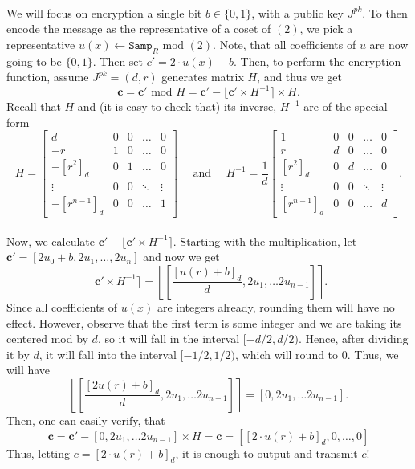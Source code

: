 \documentclass{article}
\theoremstyle{definition}
\theoremstyle{example}
\renewcommand{\mod}{\,\,\text{mod}\,\,}
\newcommand{\Samp}{\texttt{Samp}}
\renewcommand{\vec}[1]{\mathbf{#1}}
\begin{document}
\paragraph{} We will focus on encryption a single bit $b \in \{0, 1\}$, with a
public key $J^{pk}$. To then encode the message as the representative of a coset
of $(2)$, we pick a representative $u(x) \leftarrow \Samp_R \mod (2)$. Note, that all
coefficients of $u$ are now going to be $\{0, 1\}$. Then set $c' = 2\cdot u(x) + b$.
Then, to perform the encryption function, assume $J^{pk} = (d, r)$ generates
matrix $H$, and thus we get
\[
  \vec{c} = \vec{c}' \mod H = \vec{c}' - \lfloor \vec{c}' \times H^{-1} \rceil
  \times H.
\]
Recall that $H$ and (it is easy to check that) its inverse, $H^{-1}$ are of the
special form
\[
  H = \begin{bmatrix}
    d & 0 & 0 &\hdots &0 \\
    -r & 1 & 0 &\hdots &0 \\
    -[r^2]_d & 0 & 1 & \hdots& 0 \\
    \vdots & 0 & 0 & \ddots & \vdots \\
    -[r^{n - 1}]_d & 0 & 0 & \hdots & 1
  \end{bmatrix}
  \quad\text{ and }\quad
  H^{-1} = \frac{1}{d}\begin{bmatrix}
    1 & 0 & 0 &\hdots &0 \\
    r & d & 0 &\hdots &0 \\
    [r^2]_d & 0 & d & \hdots& 0 \\
    \vdots & 0 & 0 & \ddots & \vdots \\
    [r^{n - 1}]_d & 0 & 0 & \hdots & d
  \end{bmatrix}.
\]
\paragraph{} Now, we calculate $\vec{c}' - \lfloor \vec{c}' \times H^{-1} \rceil$.
Starting with the multiplication, let $\vec{c}' = [2u_0 + b, 2u_1, \hdots,
2u_n]$ and now we get
\[
  \lfloor \vec{c}' \times H^{-1} \rceil = \left\lfloor\left[\frac{[u(r) + b]_d}d , 2u_1,
    \hdots 2u_{n-1}\right] \right\rceil.
\]
Since all coefficients of $u(x)$ are integers already, rounding them will have
no effect. However, observe that the first term is some integer and we are
taking its centered mod by $d$, so it will fall in the interval $[-d/2, d/2)$.
Hence, after dividing it by $d$, it will fall into the interval $[-1/2, 1/2)$,
which will round to $0$. Thus, we will have
\[
  \left\lfloor\left[\frac{[2u(r) + b]_d}d , 2u_1,\hdots 2u_{n-1}\right]
  \right\rceil = [ 0 , 2u_1,\hdots 2u_{n-1}].
\]
Then, one can easily verify, that  
\[
  \vec{c} = \vec{c}' - [ 0 , 2u_1,\hdots 2u_{n-1}] \times H = \vec{c} = [[2\cdot
  u(r) + b]_d, 0, \hdots, 0]
\]
Thus, letting $c = [2\cdot u(r) + b]_d$, it is enough to output and transmit $c$!
\end{document}
